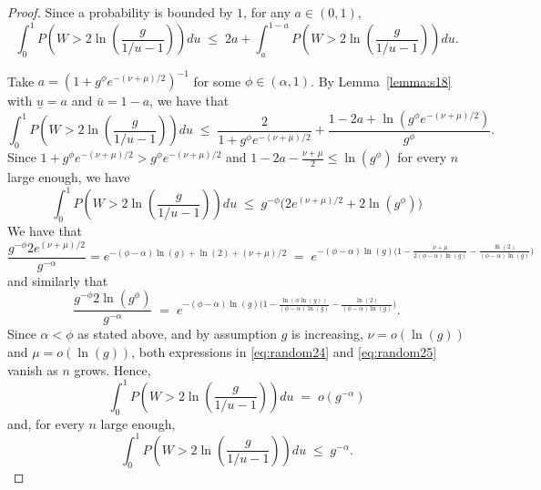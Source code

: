 \documentclass[bj,authoryear]{imsart}
\theoremstyle{plain}
\begin{document}
\begin{proof}
Since a probability is bounded by $1$, for any $a\in(0,1)$,
\begin{equation}\label{eq:basebound}
    \int_0^1 P\left(W>2 \ln \left(\frac{g}{1 / u-1}\right)\right) d u \;\leq\; 2 a+\int_{a}^{1-a} P\left(W>2\ln\left(\frac{g}{1 / u-1}\right)\right) d u.
\end{equation}

Take $a=\left(1+g^{\phi}e^{-(\nu+\mu)/ 2}\right)^{-1}$ for some $\phi\in(\alpha,1)$. By Lemma~\ref{lemma:s18} with $\underline{u}=a$ and $\bar{u}=1-a$, we have that
$$
\int_0^1 P\left(W>2 \ln \left(\frac{g}{1 / u-1}\right)\right) d u \;\leq\; \frac{2}{1+g^{\phi}e^{-(\nu+\mu)/2}}+ 
\frac{1-2a+\ln(g^{\phi}e^{-(\nu+\mu)/2})}{g^{\phi}}. $$
Since $1+g^{\phi}e^{-(\nu+\mu)/ 2}>g^{\phi}e^{-(\nu+\mu)/ 2}$ and $1-2a-\frac{\nu+\mu}{2}\leq \ln(g^\phi)$ for every $n$ large enough, we have
$$
\int_0^1 P\left(W>2 \ln \left(\frac{g}{1 / u-1}\right)\right) d u \;\leq\; g^{-\phi}\big(2e^{(\nu+\mu)/ 2}+2\ln(g^{\phi})\big) $$
We have that
\begin{equation}\label{eq:random24}
    \frac{g^{-\phi}2e^{(\nu+\mu)/ 2}}{g^{-\alpha}} 
= e^{-(\phi-\alpha) \ln(g) + \ln(2) + (\nu + \mu)/2}
    \;=\;e^{-(\phi-\alpha)\ln(g)\big(1-\frac{\nu+\mu}{2(\phi-\alpha)\ln(g)}- \frac{\ln(2)}{(\phi-\alpha)\ln(g)}\big)}
\end{equation}
and similarly that
\begin{equation}\label{eq:random25}
    \frac{g^{-\phi}2\ln(g^{\phi})}{g^{-\alpha}} \;=\;e^{-(\phi-\alpha)\ln(g)\big(1-\frac{\ln(\phi\ln(g))}{(\phi-\alpha)\ln(g)}- \frac{\ln(2)}{(\phi-\alpha)\ln(g)}\big)}.
\end{equation}
Since $\alpha<\phi$ as stated above, and by assumption $g$ is increasing, $\nu=o(\ln(g))$ and $\mu=o(\ln(g))$, both expressions in \eqref{eq:random24} and \eqref{eq:random25} vanish as $n$ grows. Hence, 
$$\int_0^1 P\left(W>2 \ln \left(\frac{g}{1 / u-1}\right)\right) d u \;=\; o(g^{-\alpha})$$
and, for every $n$ large enough,
$$
\int_0^1 P\left(W>2 \ln \left(\frac{g}{1 / u-1}\right)\right) d u \;\leq\; g^{-\alpha}.$$
\end{proof}
\end{document}
